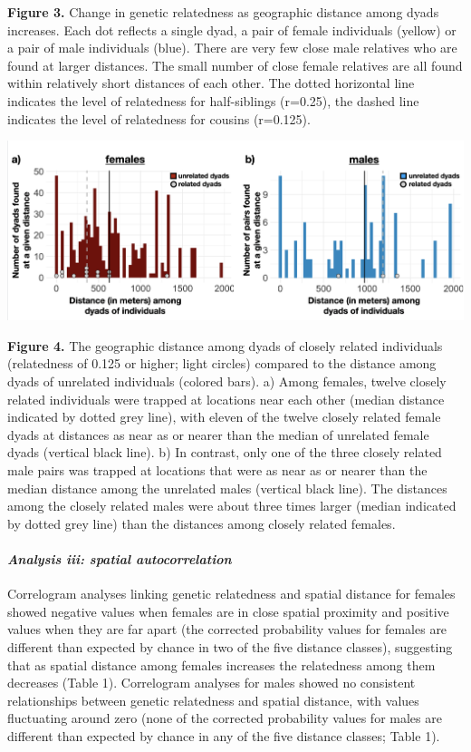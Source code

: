 \documentclass[
]{article}
\begin{document}
\textbf{Figure 3.} Change in genetic relatedness as geographic distance
among dyads increases. Each dot reflects a single dyad, a pair of female
individuals (yellow) or a pair of male individuals (blue). There are
very few close male relatives who are found at larger distances. The
small number of close female relatives are all found within relatively
short distances of each other. The dotted horizontal line indicates the
level of relatedness for half-siblings (r=0.25), the dashed line
indicates the level of relatedness for cousins (r=0.125).

\includegraphics{gdispersal_Figure3.png}

\textbf{Figure 4.} The geographic distance among dyads of closely
related individuals (relatedness of 0.125 or higher; light circles)
compared to the distance among dyads of unrelated individuals (colored
bars). a) Among females, twelve closely related individuals were trapped
at locations near each other (median distance indicated by dotted grey
line), with eleven of the twelve closely related female dyads at
distances as near as or nearer than the median of unrelated female dyads
(vertical black line). b) In contrast, only one of the three closely
related male pairs was trapped at locations that were as near as or
nearer than the median distance among the unrelated males (vertical
black line). The distances among the closely related males were about
three times larger (median indicated by dotted grey line) than the
distances among closely related females.

\hypertarget{analysis-iii-spatial-autocorrelation-1}{%
\paragraph{\texorpdfstring{\emph{Analysis iii: spatial
autocorrelation}}{Analysis iii: spatial autocorrelation}}\label{analysis-iii-spatial-autocorrelation-1}}

Correlogram analyses linking genetic relatedness and spatial distance
for females showed negative values when females are in close spatial
proximity and positive values when they are far apart (the corrected
probability values for females are different than expected by chance in
two of the five distance classes), suggesting that as spatial distance
among females increases the relatedness among them decreases (Table 1).
Correlogram analyses for males showed no consistent relationships
between genetic relatedness and spatial distance, with values
fluctuating around zero (none of the corrected probability values for
males are different than expected by chance in any of the five distance
classes; Table 1).
\end{document}
